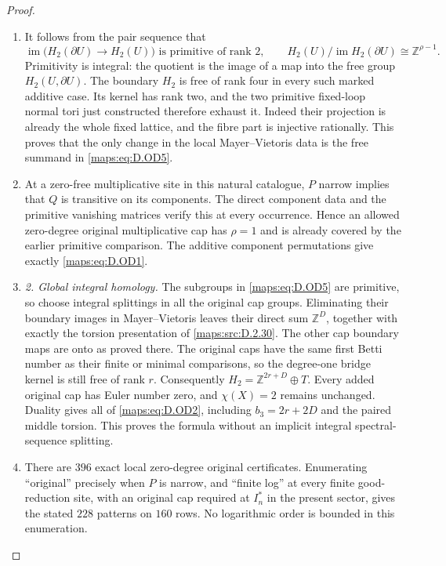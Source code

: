 \begin{proof}
\begin{enumerate}[label=\arabic*.,leftmargin=*]
\item It follows from the pair sequence that
\[
 \operatorname{im}\bigl(H_2(\partial U)\to H_2(U)\bigr)
 \text{ is primitive of rank }2,
 \qquad
 H_2(U)/\operatorname{im}H_2(\partial U)
                 \cong\mathbb Z^{\rho-1}.                 \tag{D.OD5}\label{maps:eq:D.OD5}
\]
Primitivity is integral: the quotient is the image of a map
into the free group $H_2(U,\partial U)$.
The boundary $H_2$ is free of rank four in every such marked
additive case. Its kernel has rank two, and the two primitive
fixed-loop normal tori just constructed therefore exhaust it.
Indeed their projection is already the whole fixed lattice,
and the fibre part is injective rationally. This proves that
the only change in the local Mayer--Vietoris data is the
free summand in \eqref{maps:eq:D.OD5}.

\item At a zero-free multiplicative site in this natural catalogue,
$P$ narrow implies that $Q$ is transitive on its components.
The direct component data and the primitive vanishing
matrices verify this at every occurrence. Hence an allowed
zero-degree original multiplicative cap has $\rho=1$ and
is already covered by the earlier primitive comparison.
The additive component permutations give exactly \eqref{maps:eq:D.OD1}.

\item \emph{2. Global integral homology.}
The subgroups in \eqref{maps:eq:D.OD5} are primitive, so choose integral
splittings in all the original cap groups. Eliminating their
boundary images in Mayer--Vietoris leaves their direct sum
$\mathbb Z^D$, together with exactly the torsion presentation
of \ref{maps:src:D.2.30}. The other cap boundary maps are onto as proved
there. The original caps have the same first Betti number as
their finite or minimal comparisons, so the degree-one bridge
kernel is still free of rank $r$. Consequently
$H_2=\mathbb Z^{2r+D}\oplus T$.
Every added original cap has Euler number zero, and
$\chi(X)=2$ remains unchanged. Duality gives all of \eqref{maps:eq:D.OD2},
including $b_3=2r+2D$ and the paired middle torsion.
This proves the formula without an implicit integral
spectral-sequence splitting.

\item There are $396$ exact local zero-degree original certificates.
Enumerating ``original'' precisely when $P$ is narrow,
and ``finite log'' at every finite good-reduction site,
with an original cap required at $I_n^*$ in the present
sector, gives the stated $228$ patterns on $160$ rows.
No logarithmic order is bounded in this enumeration.


\end{enumerate}
\end{proof}
